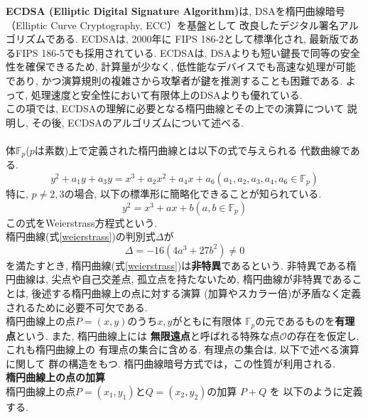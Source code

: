 \indent \textbf{ECDSA (Elliptic Digital Signature Algorithm)}は, 
DSAを楕円曲線暗号（Elliptic Curve Cryptography, ECC）を基盤として
改良したデジタル署名アルゴリズムである.
ECDSAは, 2000年に FIPS 186-2として標準化され, 
最新版であるFIPS 186-5\cite{fips186-5}でも採用されている.
ECDSAは, DSAよりも短い鍵長で同等の安全性を確保できるため, 
計算量が少なく, 低性能なデバイスでも高速な処理が可能であり, 
かつ演算規則の複雑さから攻撃者が鍵を推測することも困難である. 
よって, 処理速度と安全性において有限体上のDSAよりも優れている. \\
\indent この項では, ECDSAの理解に必要となる楕円曲線とその上での演算について
説明し, その後, ECDSAのアルゴリズムについて述べる.\\[1em]

\\
\indent 体$\mathbb{F}_p$($p$は素数)上で定義された楕円曲線とは以下の式で与えられる
代数曲線である.
\[
  y^2+a_1y+a_3y=x^3+a_2x^2+a_4x+a_6　　(a_1,a_2,a_3,a_4,a_6\in\mathbb{F}_p)
\]
特に, $p\neq 2,3$の場合, 以下の標準形に簡略化できることが知られている. 
\begin{equation}\label{weierstrass}
  y^2=x^3+ax+b　　(a,b\in\mathbb{F}_p)
\end{equation}
この式をWeierstrass方程式という\cite{安田}. \\
\indent 楕円曲線(式\ref{weierstrass})の判別式$\Delta$が
\[
  \Delta=-16(4a^3+27b^2)\neq 0
\]
を満たすとき, 楕円曲線(式\ref{weierstrass})は\textbf{非特異}であるという. 
非特異である楕円曲線は, 尖点や自己交差点, 孤立点を持たないため, 
楕円曲線が非特異であることは, 後述する楕円曲線上の点に対する演算
(加算やスカラー倍)が矛盾なく定義されるために必要不可欠である.\\
\indent 楕円曲線上の点$P=(x,y)$のうち$x,y$がともに有限体
$\mathbb{F}_p$の元であるものを\textbf{有理点}という. また, 楕円曲線上には
\textbf{無限遠点}と呼ばれる特殊な点$\mathcal{O}$の存在を仮定し, これも楕円曲線上の
有理点の集合に含める. 有理点の集合は, 以下で述べる演算に関して
群の構造をもつ. 楕円曲線暗号方式では，この性質が利用される.\\[1em]
\noindent\textbf{楕円曲線上の点の加算}\\
\indent 楕円曲線上の点$P=(x_1,y_1)$と$Q=(x_2,y_2)$の加算 $P+Q$ を
以下のように定義する.
